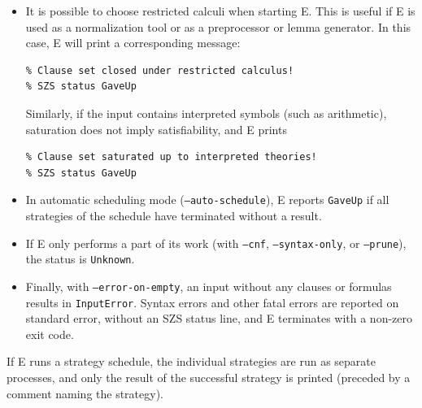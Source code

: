 \documentclass{report}
\begin{document}
\begin{itemize}
  the option \texttt{--delete-bad-limit} is given or if automatic mode
  in connection with a memory limit is used, E will periodically
  delete clauses it deems unlikely to be processed to avoid running
  out of memory. In this case, completeness cannot be ensured any
  more. This effect manifests itself extremely rarely. If it does, E
  will print the following:
\begin{verbatim}
% Failure: Out of unprocessed clauses!
% SZS status GaveUp
\end{verbatim}
  This is roughly equivalent to Otter's \texttt{SOS
    empty} message. The same output is produced if E runs out of
  clauses on a higher-order problem, since E's higher-order calculus
  is not complete.
\item It is possible to choose restricted calculi when starting
  E. This is useful if E is used as a normalization tool or as a
  preprocessor or lemma generator. In this case, E will print a
  corresponding message:
\begin{verbatim}
% Clause set closed under restricted calculus!
% SZS status GaveUp
\end{verbatim}
  Similarly, if the input contains interpreted symbols (such as
  arithmetic), saturation does not imply satisfiability, and E
  prints
\begin{verbatim}
% Clause set saturated up to interpreted theories!
% SZS status GaveUp
\end{verbatim}
\item In automatic scheduling mode (\texttt{--auto-schedule}), E
  reports \texttt{GaveUp} if all strategies of the schedule have
  terminated without a result.
\item If E only performs a part of its work (with \texttt{--cnf},
  \texttt{--syntax-only}, or \texttt{--prune}), the status is
  \texttt{Unknown}.
\item Finally, with \texttt{--error-on-empty}, an input without any
  clauses or formulas results in \texttt{InputError}. Syntax errors
  and other fatal errors are reported on standard error, without an
  SZS status line, and E terminates with a non-zero exit code.
\end{itemize}

If E runs a strategy schedule, the individual strategies are run as
separate processes, and only the result of the successful strategy is
printed (preceded by a comment naming the strategy).
\end{document}
